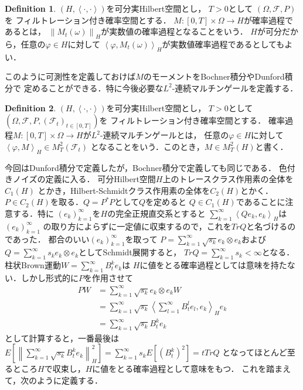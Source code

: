 \documentclass[dvipdfmx,autodetect-engine]{jsarticle}
\theoremstyle{remark}
\theoremstyle{definition}
\newtheorem{definition}{Definition}[section]
\newcommand{\norm}[1]{\left\lVert#1\right\rVert}
\newcommand{\paren}[1]{\left( #1 \right)}
\newcommand{\iprod}[1]{\left\langle #1 \right\rangle}
\begin{document}
\begin{definition}
    $(H,\iprod{\cdot,\cdot})$を可分実Hilbert空間とし，
    $T>0$として
    $(\Omega,\mathcal{F},P)$を
    フィルトレーション付き確率空間とする．
    $M\colon [0,T] \times \Omega \to H$が確率過程であるとは，
    $\norm{M_{t}(\omega)}_{H}$が実数値の確率過程となることをいう．
    $H$が可分だから，任意の$\varphi \in H$に対して
    $\iprod{\varphi, M_{t}(\omega)}_{H}$が実数値確率過程であるとしてもよい．
\end{definition}


このように可測性を定義しておけば$M$のモーメントをBochner積分やDunford積分で
定めることができる．特に今後必要な$L^2$-連続マルチンゲールを定義する．


\begin{definition}
    $(H,\iprod{\cdot,\cdot})$を可分実Hilbert空間とし，
    $T>0$として
    $(\Omega,\mathcal{F},P,(\mathcal{F}_{t})_{t\in [0,T]})$を
    フィルトレーション付き確率空間とする．
    確率過程$M\colon [0,T] \times \Omega \to H$が$L^2$-連続マルチンゲールとは，
    任意の$\varphi \in H$に対して$\iprod{\varphi,M}_{H} \in M_{T}^{2}(\mathcal{F}_{t})$
    となることをいう．このとき，$M \in M_{T}^{2}(H)$と書く．
\end{definition}


今回はDunford積分で定義したが，Bochner積分で定義しても同じである．
色付きノイズの定義に入る．
可分Hilbert空間$H$上のトレースクラス作用素の全体を$C_{1}(H)$
とかき，Hilbert-Schmidtクラス作用素の全体を$C_{2}(H)$とかく．
$P \in C_{2}(H)$を取る．$Q = P^{*}P$として$Q$を定めると
$Q \in C_{1}(H)$であることに注意する．特に
$(e_{k})_{k=1}^{\infty}$を$H$の完全正規直交系とすると
$\sum_{k=1}^{\infty} \iprod{Qe_{k},e_{k}}_{H}$は$(e_{k})_{k=1}^{\infty}$
の取り方によらずに一定値に収束するので，これを$TrQ$と名づけるのであった．
都合のいい$(e_{k})_{k=1}^{\infty}$を取って
$P = \sum_{k=1}^{\infty} \sqrt{s_{k}} e_{k} \otimes e_{k}$および
$Q = \sum_{k=1}^{\infty} s_{k} e_{k} \otimes e_{k}$としてSchmidt展開すると，
$TrQ = \sum_{k=1}^{\infty} s_{k}  <\infty$となる．
柱状Brown運動$W = \sum_{k=1}^{\infty} B_{t}^{k} e_{k}$は
$H$に値をとる確率過程としては意味を持たない．しかし形式的に$P$を作用させて
\begin{align}
    PW &= \sum_{k=1}^{\infty} \sqrt{s_{k}} e_{k} \otimes e_{k} W\\
        &= \sum_{k=1}^{\infty} \sqrt{s_{k}} \iprod{\sum_{l=1}^{\infty} B_{t}^{l} e_{l},e_{k}}_{H} e_{k}\\
        &= \sum_{k=1}^{\infty} \sqrt{s_{k}} B_{t}^{k} e_{k}
\end{align}
として計算すると，一番最後は
$E[\norm{\sum_{k=1}^{\infty} \sqrt{s_{k}} B_{t}^{k} e_{k}}_{H}^{2}] = 
\sum_{k=1}^{\infty} s_{k} E[\paren{B_{t}^{k}}^{2}] = tTrQ$
となってほとんど至るところ$H$で収束し，$H$に値をとる確率過程として意味をもつ．
これを踏まえて，次のように定義する．
\end{document}
